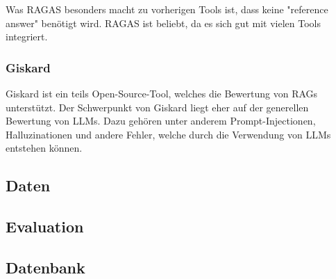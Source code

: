 Was RAGAS besonders macht zu vorherigen Tools ist, dass keine "reference answer" benötigt wird.
RAGAS ist beliebt, da es sich gut mit vielen Tools integriert.

\subsubsection{Giskard}
Giskard ist ein teils Open-Source-Tool, welches die Bewertung von RAGs unterstützt.
Der Schwerpunkt von Giskard liegt eher auf der generellen Bewertung von LLMs.
Dazu gehören unter anderem Prompt-Injectionen, Halluzinationen und andere Fehler, welche durch die Verwendung von LLMs entstehen können.



\subsection{Daten}

\subsection{Evaluation}

\subsection{Datenbank}